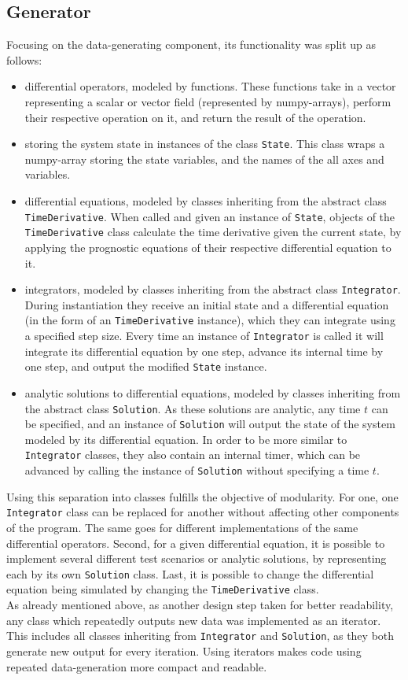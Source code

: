 \subsection*{Generator}
Focusing on the data-generating component, its functionality was split up as follows:
\begin{itemize}
\item differential operators, modeled by functions. 
These functions take in a vector representing a scalar or vector field (represented by numpy-arrays), perform their respective operation on it, and return the result of the operation.
\item storing the system state in instances of the class \texttt{State}.
This class wraps a numpy-array storing the state variables, and the names of the all axes and variables.
\item differential equations, modeled by classes inheriting from the abstract class \texttt{TimeDerivative}.
When called and given an instance of \texttt{State}, objects of the \texttt{TimeDerivative} class calculate the time derivative given the current state, by applying the prognostic equations of their respective differential equation to it.
\item integrators, modeled by classes inheriting from the abstract class \texttt{Integrator}.
During instantiation they receive an initial state and a differential equation (in the form of an \texttt{TimeDerivative} instance), which they can integrate using a specified step size.
Every time an instance of \texttt{Integrator} is called it will integrate its differential equation by one step, advance its internal time by one step, and output the modified \texttt{State} instance.
\item analytic solutions to differential equations, modeled by classes inheriting from the abstract class \texttt{Solution}.
As these solutions are analytic, any time $t$ can be specified, and an instance of \texttt{Solution} will output the state of the system modeled by its differential equation.
In order to be more similar to \texttt{Integrator} classes, they also contain an internal timer, which can be advanced by calling the instance of \texttt{Solution} without specifying a time $t$.
\end{itemize}
Using this separation into classes fulfills the objective of modularity.
For one, one \texttt{Integrator} class can be replaced for another without affecting other components of the program.
The same goes for different implementations of the same differential operators.
Second, for a given differential equation, it is possible to implement several different test scenarios or analytic solutions, by representing each by its own \texttt{Solution} class.
Last, it is possible to change the differential equation being simulated by changing the \texttt{TimeDerivative} class.
\\
As already mentioned above, as another design step taken for better readability, any class which repeatedly outputs new data was implemented as an iterator.
This includes all classes inheriting from \texttt{Integrator} and \texttt{Solution}, as they both generate new output for every iteration.
Using iterators makes code using repeated data-generation more compact and readable.

